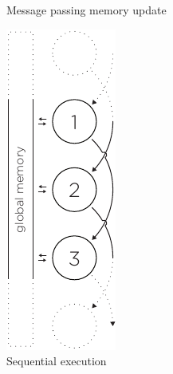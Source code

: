\begin{figure}
\begin{minipage}[t]{0.20\textwidth}
    \caption{Message passing memory update}
    \label{fig:memory-update}
  \end{minipage}
  \hfill
  \vrule
  \hfill
  \begin{minipage}[t]{0.20\textwidth}
    \centering
    \includegraphics[page=4, height=2\linewidth]{../resources/invariance.pdf}
    \vfill
    \caption{Sequential execution}
    \label{fig:sequential-execution}
  \end{minipage}
\end{figure}

